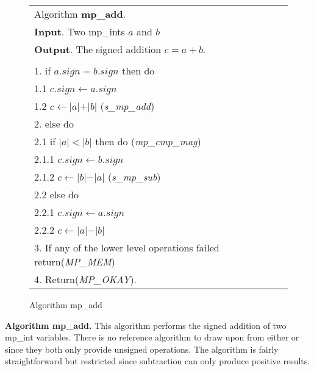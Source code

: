 \documentclass[b5paper]{book}
\begin{document}
\begin{figure}[!here]
\begin{center}
\begin{tabular}{l}
\hline Algorithm \textbf{mp\_add}. \\
\textbf{Input}.   Two mp\_ints $a$ and $b$  \\
\textbf{Output}.  The signed addition $c = a + b$. \\
\hline \\
1.  if $a.sign = b.sign$ then do \\
\hspace{3mm}1.1  $c.sign \leftarrow a.sign$  \\
\hspace{3mm}1.2  $c \leftarrow \vert a \vert + \vert b \vert$ (\textit{s\_mp\_add})\\
2.  else do \\
\hspace{3mm}2.1  if $\vert a \vert < \vert b \vert$ then do (\textit{mp\_cmp\_mag})  \\
\hspace{6mm}2.1.1  $c.sign \leftarrow b.sign$ \\
\hspace{6mm}2.1.2  $c \leftarrow \vert b \vert - \vert a \vert$ (\textit{s\_mp\_sub}) \\
\hspace{3mm}2.2  else do \\
\hspace{6mm}2.2.1  $c.sign \leftarrow a.sign$ \\
\hspace{6mm}2.2.2  $c \leftarrow \vert a \vert - \vert b \vert$ \\
3.  If any of the lower level operations failed return(\textit{MP\_MEM}) \\
4.  Return(\textit{MP\_OKAY}). \\
\hline
\end{tabular}
\end{center}
\caption{Algorithm mp\_add}
\end{figure}

\textbf{Algorithm mp\_add.}
This algorithm performs the signed addition of two mp\_int variables.  There is no reference algorithm to draw upon from either \cite{TAOCPV2} or 
\cite{HAC} since they both only provide unsigned operations.  The algorithm is fairly straightforward but restricted since subtraction can only 
produce positive results.
\end{document}
